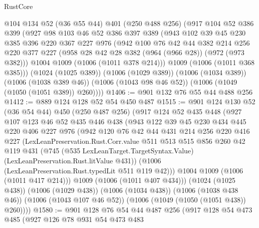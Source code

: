 \begin{lexlean}{RustCore}
\begin{coremodule}
{\begin{coremodule}
{{{{{    @104
    @134
    @52
    (@36 @55 @44)
    @401
    (@250 @488 @256)
    (@917
      @104
      @52
      @386
      @399
      (@927
        @98
        @103
        @46
        @52
        @386
        @397
        @389
        (@943
          @102
          @39
          @45
          @230
          @385
          @396
          @220
          @367
          @227
          @976
          (@942
            @100
            @76
            @42
            @44
            @382
            @214
            @256
            @220
            @377
            @227
            (@958 @28 @42 @28 @382 (@964 (@966 @28)) (@972 (@973 @382)))
            @1004
            @1009
            (@1006 (@1011 @378 @214)))
          @1009
          (@1006 (@1011 @368 @385)))
        (@1024 (@1025 @389))
        (@1006 (@1029 @389))
        (@1006 (@1034 @389))
        (@1006 (@1038 @389 @46))
        (@1006 (@1043 @98 @46 @52))
        (@1006 (@1049 (@1050 (@1051 @389)) @260))))
@1406 := @901 @132 @76 @55 @44 @488 @256
@1412 := @889 @124 @128 @52 @54 @450 @487
@1515 := @901
    @124
    @130
    @52
    (@36 @54 @44)
    @450
    (@250 @487 @256)
    (@917
      @124
      @52
      @435
      @448
      (@927
        @107
        @123
        @46
        @52
        @435
        @446
        @438
        (@943
          @122
          @39
          @45
          @230
          @434
          @445
          @220
          @406
          @227
          @976
          (@942
            @120
            @76
            @42
            @44
            @431
            @214
            @256
            @220
            @416
            @227
            (LexLeanPreservation.Rust.Corr.value
              @511
              @513
              @515
              @856
              @260
              @42
              @119
              @431
              (@745
                (@535 LexLeanTarget.TargetSyntax.Value)
                (LexLeanPreservation.Rust.litValue @431))
              (@1006 (LexLeanPreservation.Rust.typedLit @511 @119 @42)))
            @1004
            @1009
            (@1006 (@1011 @417 @214)))
          @1009
          (@1006 (@1011 @407 @434)))
        (@1024 (@1025 @438))
        (@1006 (@1029 @438))
        (@1006 (@1034 @438))
        (@1006 (@1038 @438 @46))
        (@1006 (@1043 @107 @46 @52))
        (@1006 (@1049 (@1050 (@1051 @438)) @260))))
@1580 := @901
    @128
    @76
    @54
    @44
    @487
    @256
    (@917
      @128
      @54
      @473
      @485
      (@927
        @126
        @78
        @931
        @54
        @473
        @483
}}}}}
\end{coremodule}}
\end{coremodule}
\end{lexlean}
